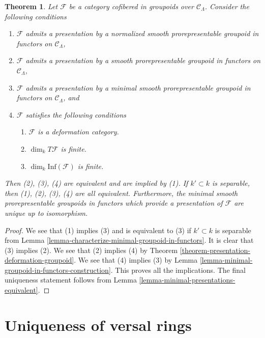 \documentclass{stacks-project}
\theoremstyle{plain}
\newtheorem{theorem}[subsection]{Theorem}
\theoremstyle{definition}
\theoremstyle{remark}
\numberwithin{equation}{subsection}
\begin{document}
\begin{theorem}
\label{theorem-minimal-smooth-prorepresentable-presentations}
Let $\mathcal{F}$ be a category cofibered in groupoids over
$\mathcal{C}_\Lambda$. Consider the following conditions
\begin{enumerate}
\item $\mathcal{F}$ admits a presentation by a normalized
smooth prorepresentable groupoid in functors on $\mathcal{C}_\Lambda$,
\item $\mathcal{F}$ admits a presentation by a
smooth prorepresentable groupoid in functors on $\mathcal{C}_\Lambda$,
\item $\mathcal{F}$ admits a presentation by a minimal
smooth prorepresentable groupoid in functors on $\mathcal{C}_\Lambda$, and
\item $\mathcal{F}$ satisfies the following conditions
\begin{enumerate}
\item $\mathcal{F}$ is a deformation category.
\item $\dim_k T\mathcal{F}$ is finite.
\item $\dim_k \text{Inf}(\mathcal{F})$ is finite.
\end{enumerate}
\end{enumerate}
Then (2), (3), (4) are equivalent and are implied by (1).
If $k' \subset k$ is separable, then (1), (2), (3), (4) are all equivalent.
Furthermore, the minimal smooth prorepresentable groupoids in functors
which provide a presentation of $\mathcal{F}$ are unique up to isomorphism.
\end{theorem}

\begin{proof}
We see that (1) implies (3) and is equivalent to (3) if
$k' \subset k$ is separable from
Lemma \ref{lemma-characterize-minimal-groupoid-in-functors}.
It is clear that (3) implies (2). We see that (2) implies (4) by
Theorem \ref{theorem-presentation-deformation-groupoid}.
We see that (4) implies (3) by
Lemma \ref{lemma-minimal-groupoid-in-functors-construction}.
This proves all the implications.
The final uniqueness statement follows from
Lemma \ref{lemma-minimal-presentations-equivalent}.
\end{proof}








\section{Uniqueness of versal rings}
\label{section-uniqueness}
\end{document}
